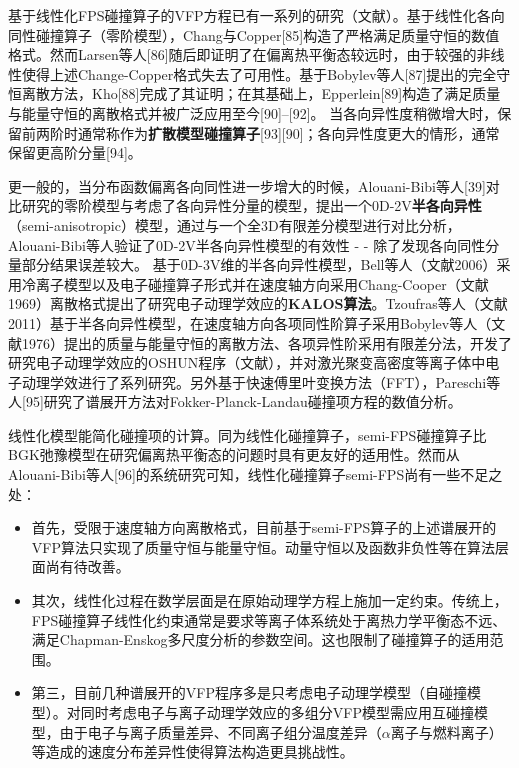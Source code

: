   基于线性化FPS碰撞算子的VFP方程已有一系列的研究（文献）。基于线性化各向同性碰撞算子（零阶模型），Chang与Copper[85]构造了严格满足质量守恒的数值格式。然而Larsen等人[86]随后即证明了在偏离热平衡态较远时，由于较强的非线性使得上述Change-Copper格式失去了可用性。基于Bobylev等人[87]提出的完全守恒离散方法，Kho[88]完成了其证明；在其基础上，Epperlein[89]构造了满足质量与能量守恒的离散格式并被广泛应用至今[90]–[92]。
  当各向异性度稍微增大时，保留前两阶时通常称作为\textbf{扩散模型碰撞算子}[93][90]；各向异性度更大的情形，通常保留更高阶分量[94]。
  
  更一般的，当分布函数偏离各向同性进一步增大的时候，Alouani-Bibi等人[39]对比研究的零阶模型与考虑了各向异性分量的模型，提出一个0D-2V\textbf{半各向异性}（semi-anisotropic）模型，通过与一个全3D有限差分模型进行对比分析，Alouani-Bibi等人验证了0D-2V半各向异性模型的有效性 - - 除了发现各向同性分量部分结果误差较大。
  基于0D-3V维的半各向异性模型，Bell等人（文献2006）采用冷离子模型以及电子碰撞算子形式并在速度轴方向采用Chang-Cooper（文献1969）离散格式提出了研究电子动理学效应的\textbf{KALOS算法}。Tzoufras等人（文献2011）基于半各向异性模型，在速度轴方向各项同性阶算子采用Bobylev等人（文献1976）提出的质量与能量守恒的离散方法、各项异性阶采用有限差分法，开发了研究电子动理学效应的OSHUN程序（文献），并对激光聚变高密度等离子体中电子动理学效进行了系列研究。另外基于快速傅里叶变换方法（FFT），Pareschi等人[95]研究了谱展开方法对Fokker-Planck-Landau碰撞项方程的数值分析。
  
  线性化模型能简化碰撞项的计算。同为线性化碰撞算子，semi-FPS碰撞算子比BGK弛豫模型在研究偏离热平衡态的问题时具有更友好的适用性。然而从Alouani-Bibi等人[96]的系统研究可知，线性化碰撞算子semi-FPS尚有一些不足之处：
  \begin{itemize}
      \item 
      首先，受限于速度轴方向离散格式，目前基于semi-FPS算子的上述谱展开的VFP算法只实现了质量守恒与能量守恒。动量守恒以及函数非负性等在算法层面尚有待改善。
      \item 
      其次，线性化过程在数学层面是在原始动理学方程上施加一定约束。传统上，FPS碰撞算子线性化约束通常是要求等离子体系统处于离热力学平衡态不远、满足Chapman-Enskog多尺度分析的参数空间。这也限制了碰撞算子的适用范围。
      \item 
      第三，目前几种谱展开的VFP程序多是只考虑电子动理学模型（自碰撞模型）。对同时考虑电子与离子动理学效应的多组分VFP模型需应用互碰撞模型，由于电子与离子质量差异、不同离子组分温度差异（$\alpha$离子与燃料离子）等造成的速度分布差异性使得算法构造更具挑战性。
  \end{itemize}
  
